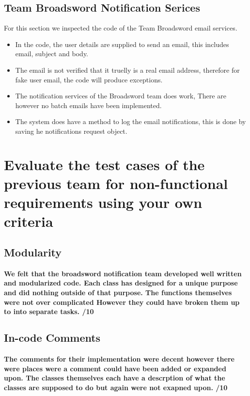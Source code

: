 \documentclass[11pt]{article}
\begin{document}
	\subsection{Team Broadsword Notification Serices}
	For this section we inspected the code of the Team Broadsword email services.
	\begin{itemize}
		\item In the code, the user details are supplied to send an email, this includes email, subject and body. 
		\item The email is not verified that it truelly is a real email address, therefore for fake user email, the code will produce exceptions. 
		\item The notification services of the Broadsword team does work, There are however no batch emails have been implemented.
		\item The system does have a method to log the email notifications, this is done by saving he notifications request object.  
	\end{itemize}
	\section{Evaluate the test cases of the previous team for non-functional requirements using your own criteria}	
		\subsection{Modularity}
			\paragraph{We felt that the broadsword notification team developed well written and modularized code. Each class has designed for a unique purpose and did nothing outside of that purpose. The functions themselves were not over complicated However they could have broken them up to into separate tasks.  /10}
		\subsection{In-code Comments}
			\paragraph{The comments for their implementation were decent however there were places were a comment could have been added or expanded upon. The classes themselves each have a descrption of what the classes are supposed to do but again were not exapned upon. /10}
\end{document}

